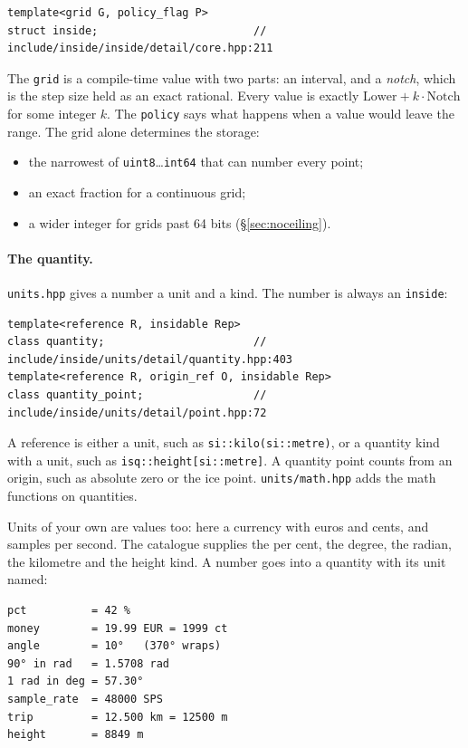 \documentclass[11pt,a4paper]{article}
\newcommand{\code}[1]{\texttt{\small #1}}
\newcommand{\file}[1]{\texttt{\small #1}}
\begin{document}
\begin{lstlisting}
template<grid G, policy_flag P>
struct inside;                        // include/inside/inside/detail/core.hpp:211
\end{lstlisting}

\noindent
The \code{grid} is a compile-time value with two parts: an interval, and a
\emph{notch}, which is the step size held as an exact rational. Every value is
exactly $\text{Lower} + k \cdot \text{Notch}$ for some integer $k$. The
\code{policy} says what happens when a value would leave the range. The grid
alone determines the storage:
\begin{itemize}
\item the narrowest of \code{uint8}\ldots\code{int64} that can number every
      point;
\item an exact fraction for a continuous grid;
\item a wider integer for grids past 64 bits (\S\ref{sec:noceiling}).
\end{itemize}

\paragraph{The quantity.} \file{units.hpp} gives a number a unit and a kind.
The number is always an \code{inside}:

\begin{lstlisting}
template<reference R, insidable Rep>
class quantity;                       // include/inside/units/detail/quantity.hpp:403
template<reference R, origin_ref O, insidable Rep>
class quantity_point;                 // include/inside/units/detail/point.hpp:72
\end{lstlisting}

\noindent
A reference is either a unit, such as \code{si::kilo(si::metre)}, or a
quantity kind with a unit, such as \code{isq::height[si::metre]}. A quantity
point counts from an origin, such as absolute zero or the ice point.
\file{units/math.hpp} adds the math functions on quantities.

Units of your own are values too: here a currency with euros and cents, and
samples per second. The catalogue supplies the per cent, the degree, the
radian, the kilometre and the height kind. A number goes into a quantity with
its unit named:


\begin{lstlisting}[style=term]
pct          = 42 %
money        = 19.99 EUR = 1999 ct
angle        = 10°   (370° wraps)
90° in rad   = 1.5708 rad
1 rad in deg = 57.30°
sample_rate  = 48000 SPS
trip         = 12.500 km = 12500 m
height       = 8849 m
\end{lstlisting}
\end{document}
